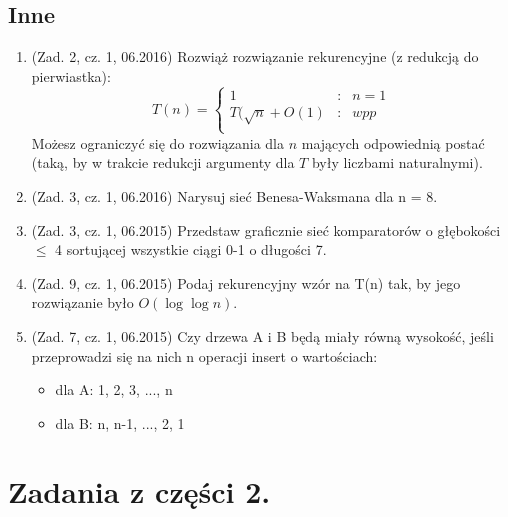\documentclass[10pt]{article}%
\begin{document}
\subsection*{Inne}

\begin{enumerate}

\item (Zad. 2, cz. 1, 06.2016) Rozwiąż rozwiązanie rekurencyjne (z redukcją do pierwiastka):
$$T(n) = \left\{\begin{array}{rcl}
1&:&n=1\\
T(\sqrt{n}+O(1)&:&wpp\\
\end{array} \right.$$
Możesz ograniczyć się do rozwiązania dla $n$ mających odpowiednią postać (taką, by w trakcie redukcji argumenty dla $T$ były liczbami naturalnymi).

\item (Zad. 3, cz. 1, 06.2016) Narysuj sieć Benesa-Waksmana dla n = 8.

\item (Zad. 3, cz. 1, 06.2015) Przedstaw graficznie sieć komparatorów o głębokości $\leq$ 4 sortującej wszystkie ciągi 0-1 o długości 7.

\item (Zad. 9, cz. 1, 06.2015) Podaj rekurencyjny wzór na T(n) tak, by jego rozwiązanie było $O(\log \log n)$.

\item (Zad. 7, cz. 1, 06.2015) Czy drzewa A i B będą miały równą wysokość, jeśli przeprowadzi się na nich n operacji insert o wartościach:
\begin{itemize}
	\item dla A: 1, 2, 3, ..., n 
	\item dla B: n, n-1, ..., 2, 1 
\end{itemize}

\end{enumerate}




\section*{Zadania z części 2.}
\end{document}
